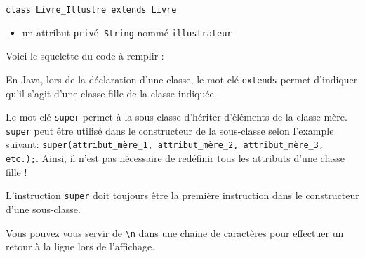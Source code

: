 \begin{Exercice}[10 minutes]
\begin{itemize}
\end{itemize}
\lstinline{class Livre_Illustre extends Livre}
\begin{itemize}
	\item un attribut \lstinline{privé String} nommé \lstinline{illustrateur}

\end{itemize}

Voici le squelette du code à remplir : \\



\begin{conseil}
En Java, lors de la déclaration d'une classe, le mot clé \lstinline{extends} permet d'indiquer qu'il s'agit d'une classe fille de la classe indiquée. 

Le mot clé \lstinline{super} permet à la sous classe d'hériter d'éléments de la classe mère. \lstinline{super} peut être utilisé dans le constructeur de la sous-classe selon l'example suivant: \lstinline{super(attribut_mère_1, attribut_mère_2, attribut_mère_3, etc.);}. Ainsi, il n'est pas nécessaire de redéfinir tous les attributs d'une classe fille !

L'instruction \lstinline{super} doit toujours être la première instruction dans le constructeur d'une sous-classe.

Vous pouvez vous servir de \lstinline{\n} dans une chaine de caractères pour effectuer un retour à la ligne lors de l'affichage.
\end{conseil}

\begin{solution}
	
\end{solution}

\end{Exercice}

